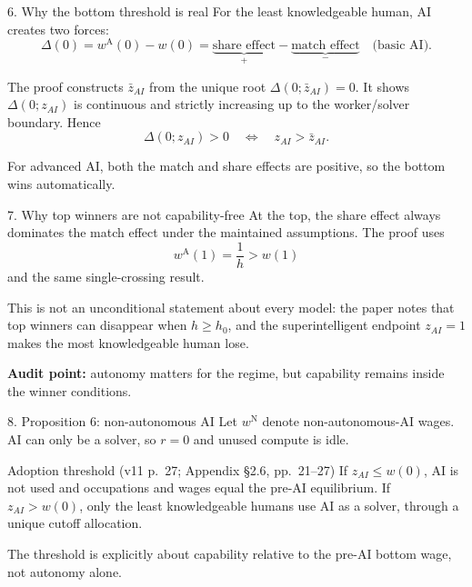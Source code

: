 \documentclass[aspectratio=169,11pt]{beamer}
\newcommand{\A}{\mathrm{A}}
\newcommand{\N}{\mathrm{N}}
\begin{document}
\begin{frame}{6. Why the bottom threshold is real}
For the least knowledgeable human, AI creates two forces:
\[
\Delta(0)=w^\A(0)-w(0)
  =\underbrace{\text{share effect}}_{+}
   -\underbrace{\text{match effect}}_{-}\quad\text{(basic AI)}.
\]

The proof constructs $\bar z_{AI}$ from the unique root
$\Delta(0;\bar z_{AI})=0$. It shows $\Delta(0;z_{AI})$ is continuous and
strictly increasing up to the worker/solver boundary. Hence
\[
\Delta(0;z_{AI})>0\quad\Longleftrightarrow\quad z_{AI}>\bar z_{AI}.
\]

For advanced AI, both the match and share effects are positive, so the bottom
wins automatically.
\end{frame}

\begin{frame}{7. Why top winners are not capability-free}
At the top, the share effect always dominates the match effect under the
maintained assumptions. The proof uses
\[
w^\A(1)=\frac1h>w(1)
\]
and the same single-crossing result.

This is not an unconditional statement about every model: the paper notes that
top winners can disappear when $h\ge h_0$, and the superintelligent endpoint
$z_{AI}=1$ makes the most knowledgeable human lose.

\medskip
\textbf{Audit point:} autonomy matters for the regime, but capability remains
inside the winner conditions.
\end{frame}

\begin{frame}{8. Proposition 6: non-autonomous AI}
Let $w^\N$ denote non-autonomous-AI wages. AI can only be a solver, so
$r=0$ and unused compute is idle.

\begin{block}{Adoption threshold (v11 p.~27; Appendix \S2.6, pp.~21--27)}
If $z_{AI}\le w(0)$, AI is not used and occupations and wages equal the pre-AI
equilibrium. If $z_{AI}>w(0)$, only the least knowledgeable humans use AI as a
solver, through a unique cutoff allocation.
\end{block}

The threshold is explicitly about capability relative to the pre-AI bottom
wage, not autonomy alone.
\end{frame}
\end{document}

